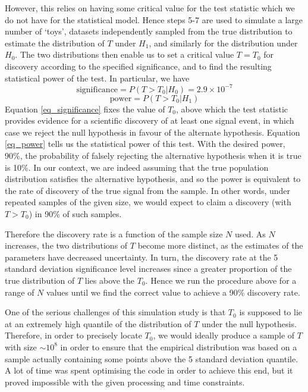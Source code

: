 \documentclass[12pt]{article}
\begin{document}
However, this relies on having some critical value for the test statistic which we do not have for the statistical model.
Hence steps 5-7 are used to simulate a large number of `toys', datasets independently sampled from the true distribution to estimate the distribution of $T$ under $H_1$, and similarly for the distribution under $H_0$.
The two distributions then enable us to set a critical value $T=T_0$ for discovery according to the specified significance, and to find the resulting statistical power of the test.
In particular, we have
\begin{equation}
\label{eq_significance}
    \text{significance} = P(T>T_0|H_0) = 2.9\times10^{-7}
\end{equation}
\begin{equation}
\label{eq_power}
    \text{power} = P(T>T_0|H_1)
\end{equation}
Equation \eqref{eq_significance} fixes the value of $T_0$, above which the test statistic provides evidence for a scientific discovery of at least one signal event, in which case we reject the null hypothesis in favour of the alternate hypothesis.
Equation \eqref{eq_power} tells us the statistical power of this test.
With the desired power, 90\%, the probability of falsely rejecting the alternative hypothesis when it is true is 10\%.
In our context, we are indeed assuming that the true population distribution satisfies the alternative hypothesis, and so the power is equivalent to the rate of discovery of the true signal from the sample.
In other words, under repeated samples of the given size, we would expect to claim a discovery (with $T>T_0$) in 90\% of such samples.

Therefore the discovery rate is a function of the sample size $N$ used.
As $N$ increases, the two distributions of $T$ become more distinct, as the estimates of the parameters have decreased uncertainty.
In turn, the discovery rate at the 5 standard deviation significance level increases since a greater proportion of the true distribution of $T$ lies above the $T_0$.
Hence we run the procedure above for a range of $N$ values until we find the correct value to achieve a 90\% discovery rate.

One of the serious challenges of this simulation study is that $T_0$ is supposed to lie at an extremely high quantile of the distribution of $T$ under the null hypothesis.
Therefore, in order to precisely locate $T_0$, we would ideally produce a sample of $T$ with size $\sim10^8$ in order to ensure that the empirical distribution was based on a sample actually containing some points above the 5 standard deviation quantile.
A lot of time was spent optimising the code in order to achieve this end, but it proved impossible with the given processing and time constraints.
\end{document}
